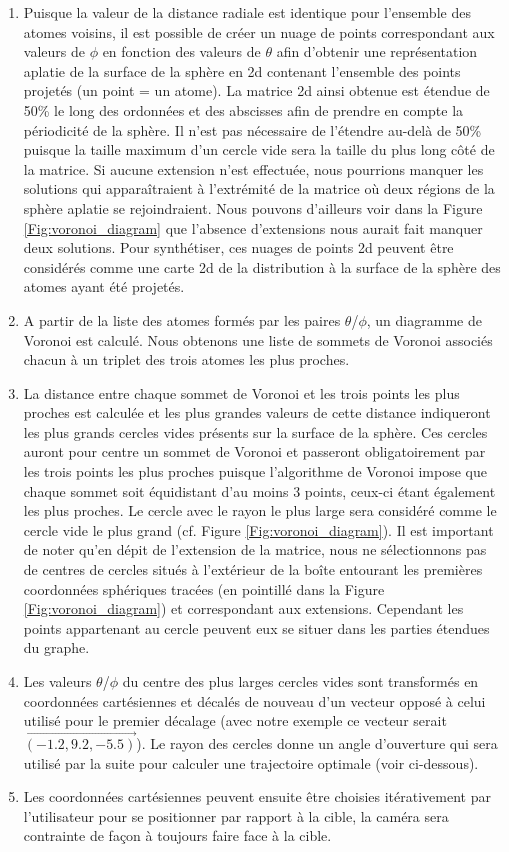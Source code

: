 \begin{enumerate}
	\item Puisque la valeur de la distance radiale est identique pour l'ensemble des atomes voisins, il est possible de créer un nuage de points correspondant aux valeurs de $\phi$ en fonction des valeurs de $\theta$ afin d'obtenir une représentation aplatie de la surface de la sphère en 2d contenant l'ensemble des points projetés (un point = un atome). La matrice 2d ainsi obtenue est étendue de 50\% le long des ordonnées et des abscisses afin de prendre en compte la périodicité de la sphère. Il n'est pas nécessaire de l'étendre au-delà de 50\% puisque la taille maximum d'un cercle vide sera la taille du plus long côté de la matrice. Si aucune extension n'est effectuée, nous pourrions manquer les solutions qui apparaîtraient à l'extrémité de la matrice où deux régions de la sphère aplatie se rejoindraient. Nous pouvons d'ailleurs voir dans la Figure \ref{Fig:voronoi_diagram} que l'absence d'extensions nous aurait fait manquer deux solutions. Pour synthétiser, ces nuages de points 2d peuvent être considérés comme une carte 2d de la distribution à la surface de la sphère des atomes ayant été projetés.
	\item A partir de la liste des atomes formés par les paires $\theta$/$\phi$, un diagramme de Voronoi est calculé. Nous obtenons une liste de sommets de Voronoi associés chacun à un triplet des trois atomes les plus proches.
	\item La distance entre chaque sommet de Voronoi et les trois points les plus proches est calculée et les plus grandes valeurs de cette distance indiqueront les plus grands cercles vides présents sur la surface de la sphère. Ces cercles auront pour centre un sommet de Voronoi et passeront obligatoirement par les trois points les plus proches puisque l'algorithme de Voronoi impose que chaque sommet soit équidistant d'au moins 3 points, ceux-ci étant également les plus proches. Le cercle avec le rayon le plus large sera considéré comme le cercle vide le plus grand (cf. Figure \ref{Fig:voronoi_diagram}). Il est important de noter qu'en dépit de l'extension de la matrice, nous ne sélectionnons pas de centres de cercles situés à l'extérieur de la boîte entourant les premières coordonnées sphériques tracées (en pointillé dans la Figure \ref{Fig:voronoi_diagram}) et correspondant aux extensions. Cependant les points appartenant au cercle peuvent eux se situer dans les parties étendues du graphe.
	\item Les valeurs $\theta$/$\phi$ du centre des plus larges cercles vides sont transformés en coordonnées cartésiennes et décalés de nouveau d'un vecteur opposé à celui utilisé pour le premier décalage (avec notre exemple ce vecteur serait $\overrightarrow{(-1.2,9.2,-5.5)}$). Le rayon des cercles donne un angle d'ouverture qui sera utilisé par la suite pour calculer une trajectoire optimale (voir ci-dessous).
	\item Les coordonnées cartésiennes peuvent ensuite être choisies itérativement par l'utilisateur pour se positionner par rapport à la cible, la caméra sera contrainte de façon à toujours faire face à la cible.
\end{enumerate}

